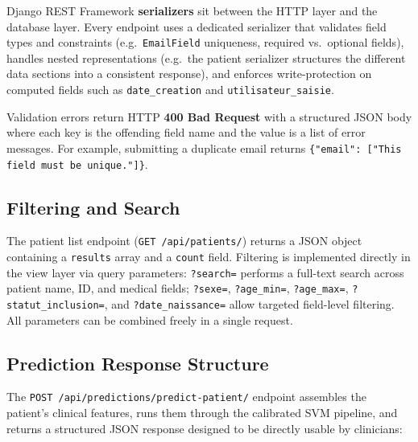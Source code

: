\documentclass[12pt,a4paper,twoside]{report}
\begin{document}
Django REST Framework \textbf{serializers} sit between the HTTP layer and the database layer. Every endpoint uses a dedicated serializer that validates field types and constraints (e.g.\ \texttt{EmailField} uniqueness, required vs.\ optional fields), handles nested representations (e.g.\ the patient serializer structures the different data sections into a consistent response), and enforces write-protection on computed fields such as \texttt{date\_creation} and \texttt{utilisateur\_saisie}.

Validation errors return HTTP \textbf{400 Bad Request} with a structured JSON body where each key is the offending field name and the value is a list of error messages. For example, submitting a duplicate email returns \texttt{\{"email": ["This field must be unique."]\}}.

\subsection{Filtering and Search}

The patient list endpoint (\texttt{GET /api/patients/}) returns a JSON object containing a \texttt{results} array and a \texttt{count} field. Filtering is implemented directly in the view layer via query parameters: \texttt{?search=} performs a full-text search across patient name, ID, and medical fields; \texttt{?sexe=}, \texttt{?age\_min=}, \texttt{?age\_max=}, \texttt{?statut\_inclusion=}, and \texttt{?date\_naissance=} allow targeted field-level filtering. All parameters can be combined freely in a single request.

\subsection{Prediction Response Structure}

The \texttt{POST /api/predictions/predict-patient/} endpoint assembles the patient's clinical features, runs them through the calibrated SVM pipeline, and returns a structured JSON response designed to be directly usable by clinicians:
\end{document}
